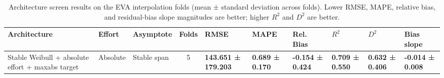 \begin{table}
    \centering
    \small
    \setlength{\tabcolsep}{4pt}
    \begin{tabularx}{\textwidth}{l l l c >{\centering\arraybackslash}X >{\centering\arraybackslash}X >{\centering\arraybackslash}X >{\centering\arraybackslash}X >{\centering\arraybackslash}X >{\centering\arraybackslash}X}
    \toprule
    Architecture & Effort & Asymptote & Folds & RMSE & MAPE & Rel. Bias & $R^2$ & $D^2$ & Bias slope \\
    \midrule
    Stable Weibull + absolute effort + maxabs target & Absolute & Stable span & 5 & \textbf{143.651 ± 179.203} & \textbf{0.689 ± 0.170} & \textbf{-0.154 ± 0.424} & \textbf{0.709 ± 0.550} & \textbf{0.632 ± 0.406} & \textbf{-0.014 ± 0.008} \\
    \bottomrule
    \end{tabularx}
    \caption{Architecture screen results on the EVA interpolation folds (mean ± standard deviation across folds). Lower RMSE, MAPE, relative bias, and residual-bias slope magnitudes are better; higher $R^2$ and $D^2$ are better.}
    \label{tab:architecture_screen_interp}
\end{table}

